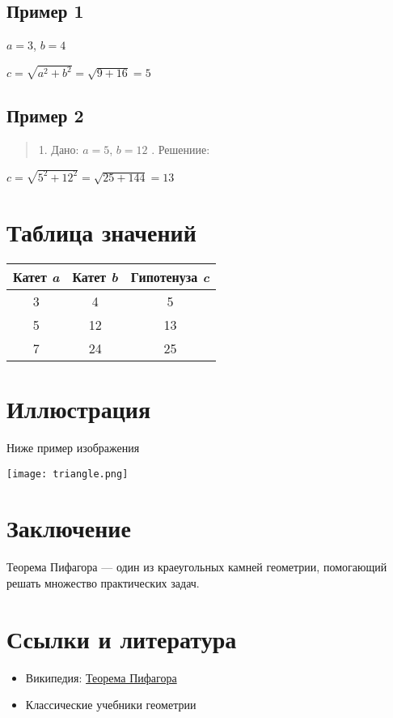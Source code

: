 \documentclass{article}
\begin{document}
\subsection*{Пример 1}
\begin{center}
    $a = 3$, $b = 4$
\end{center}
\begin{center}   
    $c = \sqrt{a^2 + b^2} = \sqrt{9 + 16} = 5$
\end{center}
\subsection*{Пример 2}
\begin{quote}
1. Дано: $a = 5$, $b = 12$ \newline
{}. Решениие: 
\end{quote}
\begin{center}
    $c = \sqrt{5^2 + 12^2} = \sqrt{25 + 144} = 13$
\end{center}

\section{Таблица значений}
\begin{center}
    \begin{tabular}{|c|c|c|}
    \hline
    Катет \textit{a} & Катет \textit{b} & Гипотенуза \textit{c} \\
    \hline
    3 & 4 & 5 \\
    \hline
    5 & 12 & 13 \\
    \hline
    7 & 24 & 25 \\
    \hline
    \end{tabular}
\end{center}

\newpage

\section{Иллюстрация}
\begin{flushleft}
    Ниже пример изображения
\end{flushleft}
\begin{center}
    \texttt{[image: triangle.png]}
\end{center}

\section{Заключение}
\begin{flushleft}
    Теорема Пифагора — один из краеугольных камней геометрии, помогающий решать множество практических задач.
\end{flushleft}

\section{Ссылки и литература}
\begin{itemize}
    \item Википедия: \href{https://ru.wikipedia.org/wiki/%D0%A2%D0%B5%D0%BE%D1%80%D0%B5%D0%BC%D0%B0_%D0%9F%D0%B8%D1%84%D0%B0%D0%B3%D0%BE%D1%80%D0%B0}{Теорема Пифагора}
    \item Классические учебники геометрии
\end{itemize}
\end{document}
